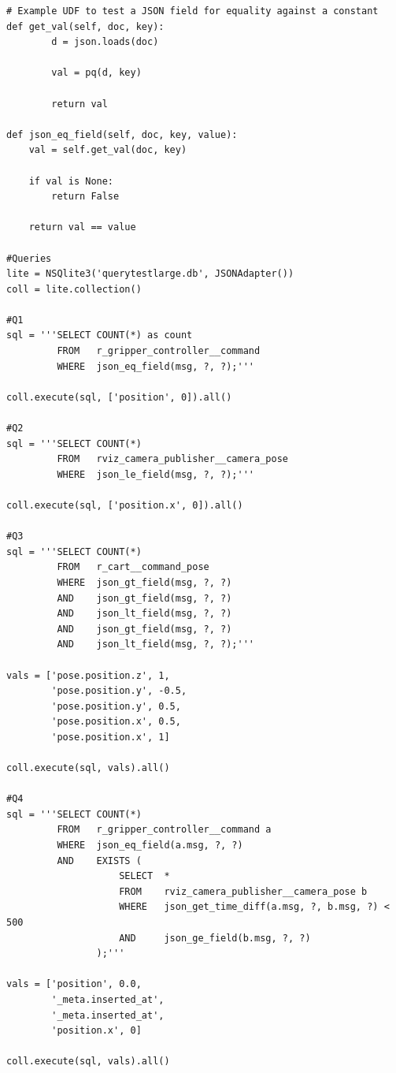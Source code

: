 \documentclass[nocopyrightspace]{acm_proc_article-sp}
\begin{document}
\begin{lstlisting}[style=pystyle]
# Example UDF to test a JSON field for equality against a constant
def get_val(self, doc, key):
		d = json.loads(doc)

		val = pq(d, key)

		return val

def json_eq_field(self, doc, key, value):
	val = self.get_val(doc, key)

	if val is None:
		return False

	return val == value
	
#Queries
lite = NSQlite3('querytestlarge.db', JSONAdapter())
coll = lite.collection()

#Q1
sql = '''SELECT COUNT(*) as count
		 FROM   r_gripper_controller__command 
		 WHERE  json_eq_field(msg, ?, ?);'''

coll.execute(sql, ['position', 0]).all()

#Q2
sql = '''SELECT COUNT(*) 
		 FROM   rviz_camera_publisher__camera_pose
		 WHERE  json_le_field(msg, ?, ?);'''

coll.execute(sql, ['position.x', 0]).all()

#Q3
sql = '''SELECT COUNT(*) 
		 FROM   r_cart__command_pose
		 WHERE  json_gt_field(msg, ?, ?)
		 AND    json_gt_field(msg, ?, ?)
		 AND    json_lt_field(msg, ?, ?)
		 AND    json_gt_field(msg, ?, ?)
		 AND    json_lt_field(msg, ?, ?);'''
		 
vals = ['pose.position.z', 1, 
		'pose.position.y', -0.5, 
		'pose.position.y', 0.5, 
		'pose.position.x', 0.5, 
		'pose.position.x', 1]
		
coll.execute(sql, vals).all()

#Q4
sql = '''SELECT COUNT(*)
		 FROM 	r_gripper_controller__command a
		 WHERE 	json_eq_field(a.msg, ?, ?)
		 AND   	EXISTS (
		 			SELECT 	*
		 			FROM 	rviz_camera_publisher__camera_pose b
		 			WHERE 	json_get_time_diff(a.msg, ?, b.msg, ?) < 500
		 			AND   	json_ge_field(b.msg, ?, ?)
		 	   	);'''

vals = ['position', 0.0, 
		'_meta.inserted_at', 
		'_meta.inserted_at',
		'position.x', 0]

coll.execute(sql, vals).all()
\end{lstlisting}

\balancecolumns
\end{document}
